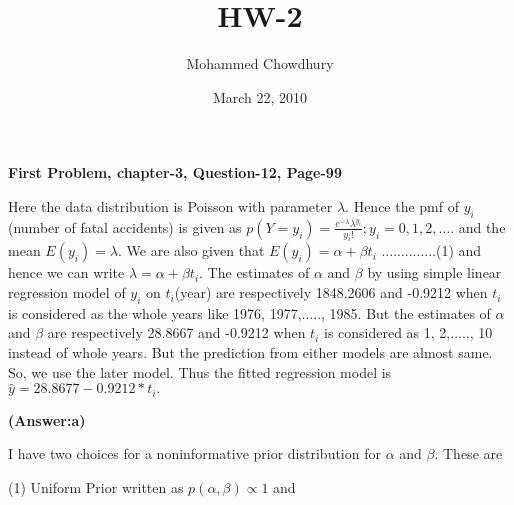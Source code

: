 \documentclass[10pt]{article}
\title{HW-2}
\author{Mohammed Chowdhury}
\date{March 22, 2010}
\begin{document}
\maketitle
\begin{center}
\textbf{First Problem, chapter-3, Question-12, Page-99}
\end{center}
Here the data distribution is Poisson with parameter $\lambda.$ Hence the pmf of $y_{i}$(number of fatal accidents) is given as $p(Y=y_{i})=\frac{e^{-\lambda}{\lambda^{y_{i}}}}{y_{i}!}; y_{i}=0,1,2, \dots.$ and the mean $E(y_{i})=\lambda$. We are also given that $E(y_{i})=\alpha+\beta t_{i}$ ..............(1) and hence we can write $\lambda=\alpha+\beta t_{i}.$ The estimates of $\alpha$ and $\beta$ by using simple linear regression model of $y_{i}$ on $t_{i}$(year) are respectively  1848.2606 and -0.9212 when $t_{i}$ is considered as the whole years like 1976, 1977,....., 1985. But the estimates of $\alpha$ and $\beta$ are respectively 28.8667 and -0.9212 when $t_{i}$ is considered as 1, 2,....., 10 instead of whole years. But the prediction from either models are almost same. So, we use the later model. Thus the fitted regression model is $\hat{y}=28.8677-0.9212*t_{i}.$
\begin{center}
\textbf{(Answer:a)}
\end{center}
I have two choices for a noninformative prior distribution for $\alpha$ and $\beta$. These are 

(1) Uniform Prior written as $p(\alpha, \beta)\propto 1$ and 
\end{document}
